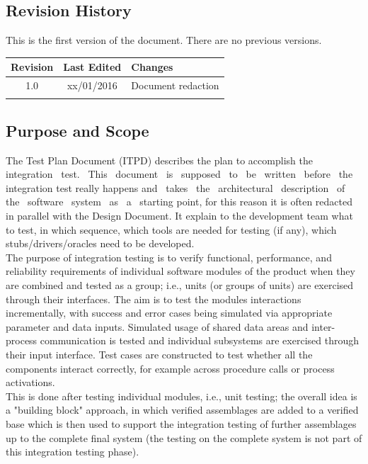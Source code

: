 \documentclass[a4paper,11pt]{report} %
\begin{document}
	\subsection{Revision History}
		This is the first version of the document. There are no previous versions.
		\renewcommand{\arraystretch}{1.5}
		\setlength{\tabcolsep}{6pt}
		\begin{center}
			\begin{tabular}{| l | p{2.5cm} | p{9cm} |}\hline
				\multicolumn{1}{|c|}{\textbf{Revision}} & \multicolumn{1}{|c|}{\textbf{Last Edited}} & \textbf{Changes}\\\hline
				\multicolumn{1}{|c|}{1.0} & \multicolumn{1}{|c|}{xx/01/2016} & Document redaction\\\hline
				 & & \\\hline
			\end{tabular}
		\end{center}
		
	\subsection{Purpose and Scope}
		The Test Plan Document (ITPD) describes the plan to accomplish the  integration  test.  This  document  is  supposed  to  be  written  before  the  integration  test  really  happens and  takes  the  architectural  description  of  the  software  system  as  a  starting point, for this reason it is often redacted in parallel with the Design Document. It explain to the development team what to test, in which sequence, which tools are needed for testing (if any), which stubs/drivers/oracles need to be developed.\\		
		The purpose of integration testing is to verify functional, performance, and reliability requirements of individual software modules of the product when they are combined and tested as a group; i.e., units (or groups of units) are exercised through their interfaces. The aim is to test the modules interactions incrementally, with success and error cases being simulated via appropriate parameter and data inputs. Simulated usage of shared data areas and inter-process communication is tested and individual subsystems are exercised through their input interface. Test cases are constructed to test whether all the components interact correctly, for example across procedure calls or process activations.\\
		This is done after testing individual modules, i.e., unit testing; the overall idea is a "building block" approach, in which verified assemblages are added to a verified base which is then used to support the integration testing of further assemblages up to the complete final system (the testing on the complete system is not part of this integration testing phase).
		
\end{document}
